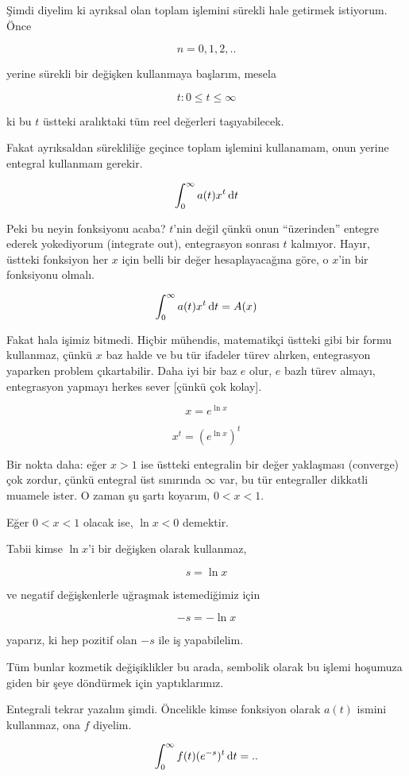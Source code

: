 \documentclass[12pt,fleqn]{article}\usepackage{../../common}
\begin{document}
Şimdi diyelim ki ayrıksal olan toplam işlemini sürekli hale getirmek
istiyorum. Önce

$$ n = 0,1,2,.. $$

yerine sürekli bir değişken kullanmaya başlarım, mesela

$$ t: 0 \le t \le \infty $$

ki bu $t$ üstteki aralıktaki tüm reel değerleri taşıyabilecek. 

Fakat ayrıksaldan sürekliliğe geçince toplam işlemini kullanamam, onun
yerine entegral kullanmam gerekir. 

$$ \int_0^{\infty} a(t)x^t \,\mathrm{d} t $$

Peki bu neyin fonksiyonu acaba? $t$'nin değil çünkü onun ``üzerinden'' entegre
ederek yokediyorum (integrate out), entegrasyon sonrası $t$ kalmıyor. Hayır,
üstteki fonksiyon her $x$ için belli bir değer hesaplayacağına göre, o $x$'in
bir fonksiyonu olmalı.

$$ \int_0^{\infty} a(t)x^t \,\mathrm{d} t = A(x)$$

Fakat hala işimiz bitmedi. Hiçbir mühendis, matematikçi üstteki gibi bir
formu kullanmaz, çünkü $x$ baz halde ve bu tür ifadeler türev alırken,
entegrasyon yaparken problem çıkartabilir. Daha iyi bir baz $e$ olur, $e$
bazlı türev almayı, entegrasyon yapmayı herkes sever [çünkü çok kolay]. 

$$ x = e^{\ln x} $$

$$ x^t = (e^{\ln x})^t $$

Bir nokta daha: eğer $x > 1$ ise üstteki entegralin bir değer yaklaşması
(converge) çok zordur, çünkü entegral üst sınırında $\infty$ var, bu tür
entegraller dikkatli muamele ister. O zaman şu şartı koyarım, $0 < x < 1$. 

Eğer  $0 < x < 1$ olacak ise, $\ln x < 0$ demektir. 

Tabii kimse $\ln x$'i bir değişken olarak kullanmaz, 

$$ s = \ln x $$

ve negatif değişkenlerle uğraşmak istemediğimiz için 

$$ -s = -\ln x $$ 

yaparız, ki hep pozitif olan $-s$ ile iş yapabilelim. 

Tüm bunlar kozmetik değişiklikler bu arada, sembolik olarak bu işlemi
hoşumuza giden bir şeye döndürmek için yaptıklarımız. 

Entegrali tekrar yazalım şimdi. Öncelikle kimse fonksiyon olarak $a(t)$
ismini kullanmaz, ona $f$ diyelim. 

$$ \int_0^{\infty} f(t)(e^{-s})^t \,\mathrm{d} t = ..$$
\end{document}
